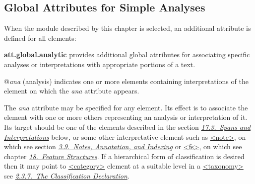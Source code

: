 \subsection[{Global Attributes for Simple Analyses}]{Global Attributes for Simple Analyses}\label{AIATTS}\par
When the module described by this chapter is selected, an additional attribute is defined for all elements: 
\begin{sansreflist}
  
\item [\textbf{att.global.analytic}] provides additional global attributes for associating specific analyses or interpretations with appropriate portions of a text.\hfil\\[-10pt]\begin{sansreflist}
    \item[@{\itshape ana}]
  (analysis) indicates one or more elements containing interpretations of the element on which the {\itshape ana} attribute appears.
\end{sansreflist}  
\end{sansreflist}
 The {\itshape ana} attribute may be specified for any element. Its effect is to associate the element with one or more others representing an analysis or interpretation of it. Its target should be one of the elements described in the section \textit{\hyperref[AISP]{17.3.\ Spans and Interpretations}} below, or some other interpretative element such as \hyperref[TEI.note]{<note>}, on which see section \textit{\hyperref[CONO]{3.9.\ Notes, Annotation, and Indexing}} or \hyperref[TEI.fs]{<fs>}, on which see chapter \textit{\hyperref[FS]{18.\ Feature Structures}}. If a hierarchical form of classification is desired then it may point to \hyperref[TEI.category]{<category>} element at a suitable level in a \hyperref[TEI.taxonomy]{<taxonomy>} see \textit{\hyperref[HD55]{2.3.7.\ The Classification Declaration}}.
